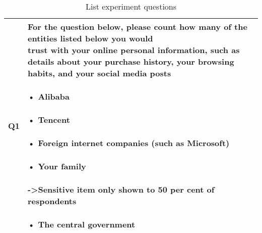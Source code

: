 \documentclass[
  letterpaper,
  DIV=11,
  numbers=noendperiod]{scrartcl}
\begin{document}
\hypertarget{tbl-listexp.q.text}{}
\begin{table}
\caption{\label{tbl-listexp.q.text}List experiment questions }\tabularnewline

\centering
\begin{tabular}[t]{l|l}
\hline
Q1 & \makecell[c]{For the question below, please count how many of the entities listed below you would\\trust with your online personal information, such as details about your purchase history, your browsing habits, and your social media posts\\ \\• Alibaba\\\\• Tencent\\\\• Foreign internet companies (such as Microsoft)\\\\• Your family\\\\->Sensitive item only shown to 50 per cent of respondents\\\\• The central government}\\
\hline
\end{tabular}
\end{table}
\end{document}

